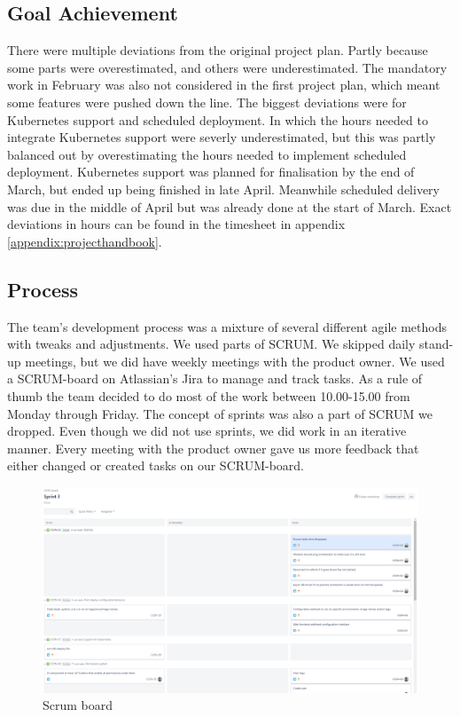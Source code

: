 \subsection{Goal Achievement}
There were multiple deviations from the original project plan. Partly because some parts were overestimated, and others were underestimated. The mandatory work in February was also not considered in the first project plan, which meant some features were pushed down the line. The biggest deviations were for Kubernetes support and scheduled deployment. In which the hours needed to integrate Kubernetes support were severly underestimated, but this was partly balanced out by overestimating the hours needed to implement scheduled deployment. Kubernetes support was planned for finalisation by the end of March, but ended up being finished in late April. Meanwhile scheduled delivery was due in the middle of April but was already done at the start of March. Exact deviations in hours can be found in the timesheet in appendix \ref{appendix:projecthandbook}.


\subsection{Process}
The team's development process was a mixture of several different agile methods with tweaks and adjustments. We used parts of SCRUM. We skipped daily stand-up meetings, but we did have weekly meetings with the product owner. We used a SCRUM-board on Atlassian's Jira to manage and track tasks. As a rule of thumb the team decided to do most of the work between 10.00-15.00 from Monday through Friday. The concept of sprints was also a part of SCRUM we dropped. Even though we did not use sprints, we did work in an iterative manner. Every meeting with the product owner gave us more feedback that either changed or created tasks on our SCRUM-board.

\begin{figure}[h!]
  \includegraphics[width=\linewidth,height=\textheight,keepaspectratio]{images/scrum_board.png}
  \caption{Scrum board}
  \label{fig:scrumboard}
\end{figure}


